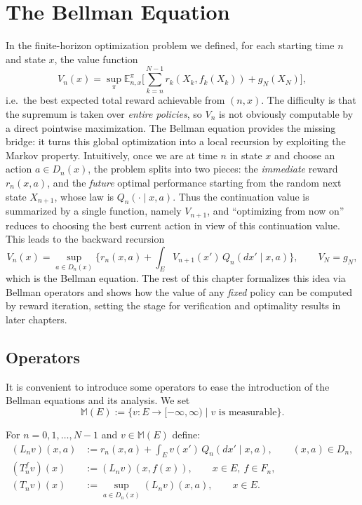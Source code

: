 \chapter{The Bellman Equation}
In the finite-horizon optimization problem we defined, for each starting time $n$ and state $x$, the value function
\[
V_n(x)=\sup_{\pi}\mathbb{E}_{n,x}^{\pi}\Big[\sum_{k=n}^{N-1} r_k(X_k,f_k(X_k)) + g_N(X_N)\Big],
\]
i.e.\ the best expected total reward achievable from $(n,x)$. The difficulty is that the supremum is taken over \emph{entire policies}, so $V_n$ is not obviously computable by a direct pointwise maximization. The Bellman equation provides the missing bridge: it turns this global optimization into a local recursion by exploiting the Markov property. Intuitively, once we are at time $n$ in state $x$ and choose an action $a\in D_n(x)$, the problem splits into two pieces: the \emph{immediate} reward $r_n(x,a)$, and the \emph{future} optimal performance starting from the random next state $X_{n+1}$, whose law is $Q_n(\cdot\mid x,a)$. Thus the continuation value is summarized by a single function, namely $V_{n+1}$, and ``optimizing from now on'' reduces to choosing the best current action in view of this continuation value. This leads to the backward recursion
\[
V_n(x)=\sup_{a\in D_n(x)}\Big\{r_n(x,a)+\int_E V_{n+1}(x')\,Q_n(dx'\mid x,a)\Big\},
\qquad V_N=g_N,
\]
which is the Bellman equation. The rest of this chapter formalizes this idea via Bellman operators and shows how the value of any \emph{fixed} policy can be computed by reward iteration, setting the stage for verification and optimality results in later chapters.

\section{Operators}
It is convenient to introduce some operators to ease the introduction of the Bellman equations and its analysis. We set
\[
\mathcal{\mathbb{M}}(E) := \{v:E\to[-\infty,\infty)\;|\; v\text{ is measurable}\}.
\]

\begin{definition}
For $n=0,1,\dots,N-1$ and $v\in\mathcal{\mathbb{M}}(E)$ define:
\begin{align*}
(L_n v)(x,a) &:= r_n(x,a) + \int_E v(x')\,Q_n(dx'\mid x,a), \qquad (x,a)\in D_n, \\
(T_n^f v)(x) &:= (L_n v)(x,f(x)), \qquad x\in E,\ f\in F_n,\\
(T_n v)(x) &:= \sup_{a\in D_n(x)} (L_n v)(x,a), \qquad x\in E.
\end{align*}
\end{definition}

